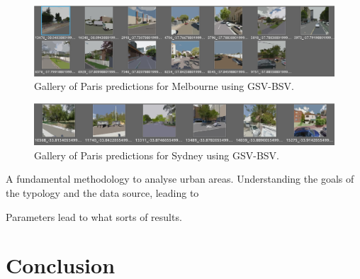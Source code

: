\documentclass[sageh,times]{sagej}
\begin{document}
\begin{figure}[!htbp]
\centering    
\includegraphics[scale=0.50]{Images/MelbourneLikeParis/Melbourne_streetview_gallery.png} 
\caption{Gallery of Paris predictions for Melbourne using GSV-BSV.}    
 \label{fig:gsv_mel_gallery}  
\end{figure} 

\begin{figure}[!htbp]
\centering    
\includegraphics[scale=0.50]{Images/SydneyLikeParis/Sydney_streetview_gallery.png} 
\caption{Gallery of Paris predictions for Sydney using GSV-BSV.}    
 \label{fig:gsv_syd_gallery}  
\end{figure} 















A fundamental methodology to analyse urban areas. Understanding the goals of the typology and the data source, leading to 

Parameters lead to what sorts of results.










\section{Conclusion}\label{sec:conclusion}


  
  
\end{document}
